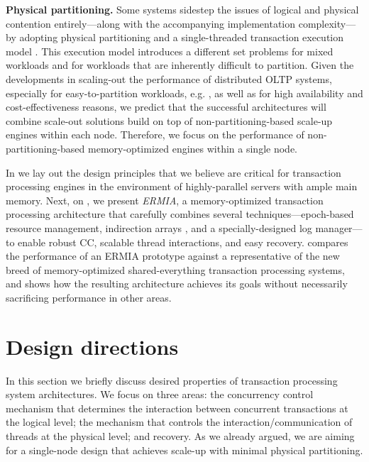 \vspace{2mm}
{\bf Physical partitioning.} Some systems sidestep the issues of logical and physical contention entirely---along with the accompanying implementation complexity---by adopting physical partitioning and a single-threaded transaction execution model \cite{Kallman+08,KemperN11}. This execution model introduces a different set problems for mixed workloads and for workloads that are inherently difficult to partition.  Given the developments in scaling-out the performance of distributed OLTP systems, especially for easy-to-partition workloads, e.g. \cite{Corbett+12,BailisFHGS14,ThomsonA10}, as well as for high availability and cost-effectiveness reasons, we predict that the successful architectures will combine scale-out solutions build on top of non-partitioning-based scale-up engines within each node.
Therefore, we focus on the performance of non-partitioning-based memory-optimized engines within a single node.

\vspace{2mm}
In  we lay out the design principles that we believe are critical for transaction processing engines in the environment of highly-parallel servers with ample main memory. Next, on , we present {\em ERMIA}, a memory-optimized transaction processing architecture that carefully combines several techniques---epoch-based resource management, indirection arrays \cite{SadoghiRCB13}, and a specially-designed log manager---to enable robust CC, scalable thread interactions, and easy recovery.  
 compares the performance of an ERMIA prototype against a representative of the new breed of memory-optimized shared-everything transaction processing systems, and shows how the resulting architecture achieves its goals without necessarily sacrificing performance in other areas.

\section{Design directions}

In this section we briefly discuss desired properties of transaction processing system architectures. We focus on three areas: the concurrency control mechanism that determines the interaction between concurrent transactions at the logical level; the mechanism that controls the interaction/communication of threads at the physical level; and recovery. As we already argued, we are aiming for a single-node design that achieves scale-up with minimal physical partitioning.  

